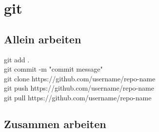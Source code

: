 \chapter{git}
\section{Allein arbeiten}
git add .\\
git commit -m "commit message"\\
git clone https://github.com/username/repo-name\\
git push https://github.com/username/repo-name\\
git pull https://github.com/username/repo-name\\

\section{Zusammen arbeiten}